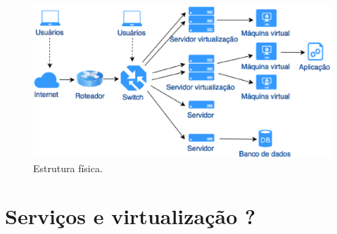 \begin{figure}[servfisicos]
 \centering
 \includegraphics[width=430px]{img/servfisicos.eps}
 \caption{Estrutura física.}
 \label{fig:servfisicos}
\end{figure}

\section{Serviços e virtualização ?}
\label{section:servicos}

